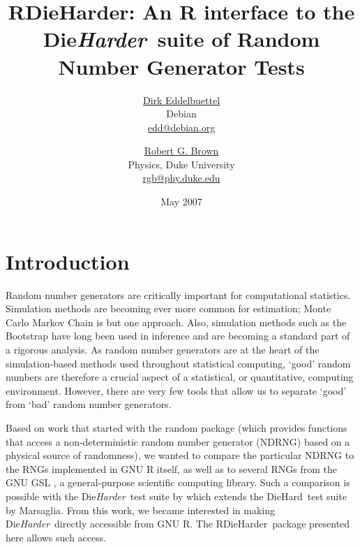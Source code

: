 \documentclass[12pt]{article}
\newcommand{\pkg}[1]{{\normalfont\fontseries{b}\selectfont #1}}
\newcommand{\diehard}{\textrm{DieHard}}
\newcommand{\dieharder}{\textrm{Die}\textsl{Harder}}
\newcommand{\rdieharder}{\pkg{RDieHarder}}
\begin{document}


\title{\pkg{RDieHarder}: An R interface to the \dieharder\ suite of Random
  Number Generator Tests}
\author{\href{http://dirk.eddelbuettel.com}{Dirk Eddelbuettel} \\ 
  Debian \\ \url{edd@debian.org} 
  \and
  \href{http://www.phy.duke.edu/~rgb}{Robert G. Brown} \\ 
  Physics, Duke University \\ \url{rgb@phy.duke.edu} }
\date{May 2007}

\maketitle

\section{Introduction}

Random number generators are critically important for computational
statistics.  Simulation methods are becoming ever more common for estimation;
Monte Carlo Markov Chain is but one approach. Also, simulation methods such
as the Bootstrap have long been used in inference and are becoming a standard
part of a rigorous analysis.  As random number generators are at the heart of 
the simulation-based methods used throughout statistical computing, `good'
random numbers are therefore a crucial aspect of a statistical, or
quantitative, computing environment.  However, there are very few tools that
allow us to separate `good' from `bad' random number generators.

Based on work that started with the \pkg{random} package
\citep{Eddelbuettel:random:2007} (which provides functions that access a
non-deterministic random number generator (NDRNG) based on a physical source
of randomness), we wanted to compare the particular NDRNG to the RNGs
implemented in GNU R \citep{RCore:R:2007} itself, as well as to several RNGs
from the GNU GSL \citep{gsl:2007}, a general-purpose scientific computing
library.  Such a comparison is possible with the \dieharder\ test suite by
\cite{Brown:dieharder:2007} which extends the \diehard\ test suite by
Marsaglia.  From this work, we became interested in making \dieharder\
directly accessible from GNU R. The \rdieharder\ package presented here
allows such access.
\end{document}

